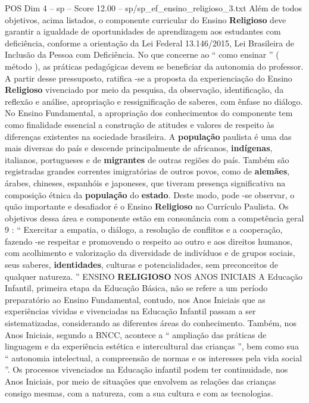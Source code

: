 \begin{textsample}{POS Dim 4 – sp – Score 12.00 – sp/sp\_ef\_ensino\_religioso\_3.txt}
Além de todos objetivos, acima listados, o componente curricular do Ensino \textbf{Religioso} deve garantir a igualdade de oportunidades de aprendizagem aos estudantes com deficiência, conforme a orientação da Lei Federal 13.146/2015, Lei Brasileira de Inclusão da Pessoa com Deficiência.
No que concerne ao “ como ensinar ” ( método ), as práticas pedagógicas devem se beneficiar da autonomia do professor.
A partir desse pressuposto, ratifica -se a proposta da experienciação do Ensino \textbf{Religioso} vivenciado por meio da pesquisa, da observação, identificação, da reflexão e análise, apropriação e ressignificação de saberes, com ênfase no diálogo.
No Ensino Fundamental, a apropriação dos conhecimentos do componente tem como finalidade essencial a construção de atitudes e valores de respeito às diferenças existentes na sociedade brasileira.
A \textbf{população} paulista é uma das mais diversas do país e descende principalmente de africanos, \textbf{indígenas}, italianos, portugueses e de \textbf{migrantes} de outras regiões do país.
Também são registradas grandes correntes imigratórias de outros povos, como de \textbf{alemães}, árabes, chineses, espanhóis e japoneses, que tiveram presença significativa na composição étnica da \textbf{população} do \textbf{estado}.
Deste modo, pode -se observar, o quão importante e desafiador é o Ensino \textbf{Religioso} no Currículo Paulista.
Os objetivos dessa área e componente estão em consonância com a competência geral 9 : “ Exercitar a empatia, o diálogo, a resolução de conflitos e a cooperação, fazendo -se respeitar e promovendo o respeito ao outro e aos direitos humanos, com acolhimento e valorização da diversidade de indivíduos e de grupos sociais, seus saberes, \textbf{identidades}, culturas e potencialidades, sem preconceitos de qualquer natureza. ” ENSINO \textbf{RELIGIOSO} NOS ANOS INICIAIS A Educação Infantil, primeira etapa da Educação Básica, não se refere a um período preparatório ao Ensino Fundamental, contudo, nos Anos Iniciais que as experiências vividas e vivenciadas na Educação Infantil passam a ser sistematizadas, considerando as diferentes áreas do conhecimento.
Também, nos Anos Iniciais, segundo a BNCC, acontece a “ ampliação das práticas de linguagem e da experiência estética e intercultural das crianças ”, bem como sua “ autonomia intelectual, a compreensão de normas e os interesses pela vida social ”.
Os processos vivenciados na Educação infantil podem ter continuidade, nos Anos Iniciais, por meio de situações que envolvem as relações das crianças consigo mesmas, com a natureza, com a sua cultura e com as tecnologias.

\end{textsample}
